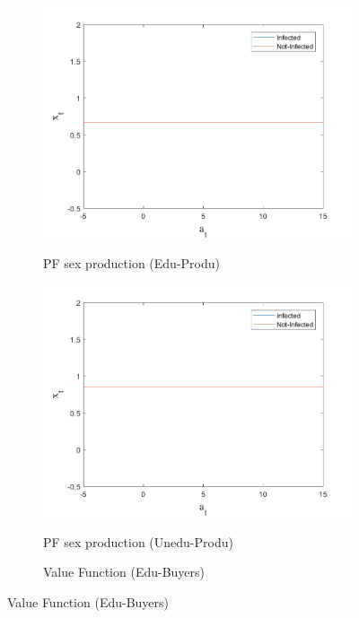 \begin{figure}[H]
\bigskip
\begin{subfigure}{0.5\textwidth}\caption{PF sex production (Edu-Produ)}
   \includegraphics[width=\linewidth,height = 0.22\textheight]{figures/pre/FIG11.png}
    \label{fig_dert}
\end{subfigure}
\hspace*{\fill}
\begin{subfigure}{0.5\textwidth}\caption{PF sex production (Unedu-Produ)}
   \includegraphics[width=\linewidth,height = 0.22\textheight]{figures/pre/FIG12.png}
    \label{fig:x_b}
\end{subfigure}
\bigskip
\begin{subfigure}{0.5\textwidth}\caption{Value Function (Edu-Buyers)}

\end{subfigure}
\end{figure}
